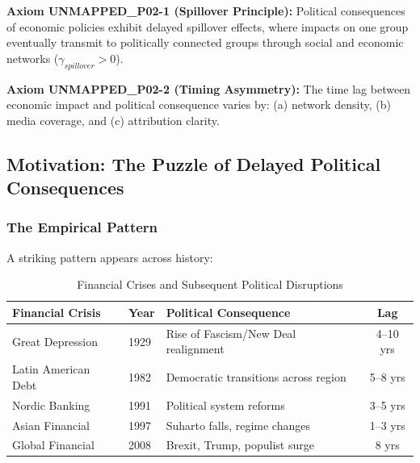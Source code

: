\begin{tcolorbox}[colback=yellow!5!white, colframe=yellow!75!black,
    title=Axiom UNMAPPED_P02-1: Spillover Dynamics]
\textbf{Axiom UNMAPPED_P02-1 (Spillover Principle):}
Political consequences of economic policies exhibit delayed spillover effects,
where impacts on one group eventually transmit to politically connected groups
through social and economic networks ($\gamma_{spillover} > 0$).
\end{tcolorbox}

\begin{tcolorbox}[colback=yellow!5!white, colframe=yellow!75!black,
    title=Axiom UNMAPPED_P02-2: Asymmetric Timing]
\textbf{Axiom UNMAPPED_P02-2 (Timing Asymmetry):}
The time lag between economic impact and political consequence varies by:
(a) network density, (b) media coverage, and (c) attribution clarity.
\end{tcolorbox}



\subsection{Motivation: The Puzzle of Delayed Political Consequences}

\subsubsection{The Empirical Pattern}

A striking pattern appears across history:

\begin{table}[htbp]
\centering
\caption{Financial Crises and Subsequent Political Disruptions}
\label{tab:historical-pattern}
\small
\begin{tabular}{@{}lllc@{}}
\toprule
\textbf{Financial Crisis} & \textbf{Year} & \textbf{Political Consequence} & \textbf{Lag} \\
\midrule
Great Depression & 1929 & Rise of Fascism/New Deal realignment & 4--10 yrs \\
Latin American Debt & 1982 & Democratic transitions across region & 5--8 yrs \\
Nordic Banking & 1991 & Political system reforms & 3--5 yrs \\
Asian Financial & 1997 & Suharto falls, regime changes & 1--3 yrs \\
Global Financial & 2008 & Brexit, Trump, populist surge & 8 yrs \\
\bottomrule
\end{tabular}
\end{table}

